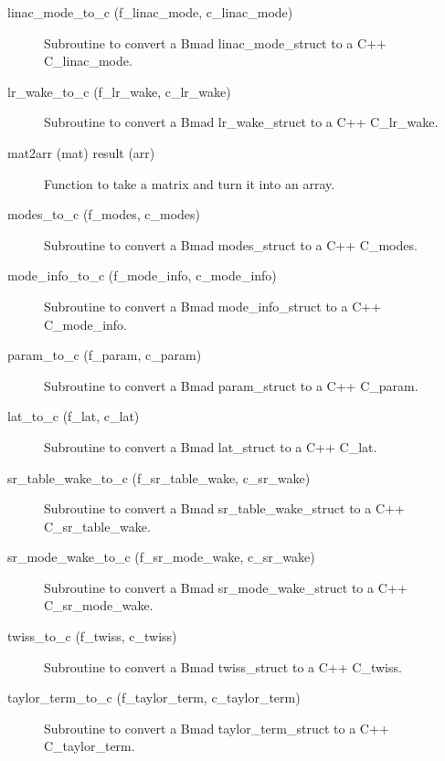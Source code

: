 \begin{description}
\label{r:linac.mode.to.c}
\item[linac_mode_to_c (f_linac_mode, c_linac_mode)] \Newline 
Subroutine to convert a Bmad linac_mode_struct to a C++ C_linac_mode.

\label{r:lr.wake.to.c}
\item[lr_wake_to_c (f_lr_wake, c_lr_wake)] \Newline 
Subroutine to convert a Bmad lr_wake_struct to a C++ C_lr_wake.

\label{r:mat2arr}
\item[mat2arr (mat) result (arr)] \Newline 
Function to take a matrix and turn it into an array.

\label{r:modes.to.c}
\item[modes_to_c (f_modes, c_modes)] \Newline 
Subroutine to convert a Bmad modes_struct to a C++ C_modes.

\label{r:mode.info.to.c}
\item[mode_info_to_c (f_mode_info, c_mode_info)] \Newline 
Subroutine to convert a Bmad mode_info_struct to a C++ C_mode_info.

\label{r:param.to.c}
\item[param_to_c (f_param, c_param)] \Newline 
Subroutine to convert a Bmad param_struct to a C++ C_param.

\label{r:lat.to.c}
\item[lat_to_c (f_lat, c_lat)] \Newline 
Subroutine to convert a Bmad lat_struct to a C++ C_lat.

\label{r:sr.table.wake.to.c}
\item[sr_table_wake_to_c (f_sr_table_wake, c_sr_wake)] \Newline 
Subroutine to convert a Bmad sr_table_wake_struct to a C++ C_sr_table_wake.

\label{r:sr.mode.wake.to.c}
\item[sr_mode_wake_to_c (f_sr_mode_wake, c_sr_wake)] \Newline 
Subroutine to convert a Bmad sr_mode_wake_struct to a C++ C_sr_mode_wake.

\label{r:twiss.to.c}
\item[twiss_to_c (f_twiss, c_twiss)] \Newline 
Subroutine to convert a Bmad twiss_struct to a C++ C_twiss.

\label{r:taylor.term.to.c}
\item[taylor_term_to_c (f_taylor_term, c_taylor_term)] \Newline 
Subroutine to convert a Bmad taylor_term_struct to a C++ C_taylor_term.


\end{description}
